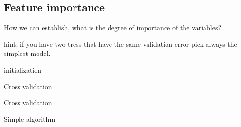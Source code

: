 \documentclass[10pt,a4paper]{article}
\begin{document}
\subsection{Feature importance}
How we can establish, what is the degree of importance of the variables?

hint: if you have two tress that have the same validation error pick always the simplest model.


\begin{algorithm}[H]
\SetAlgoLined
{}
 initialization\;
 \caption{Cross validation}
\end{algorithm}


\begin{algorithm}[H]
\SetAlgoLined
{} 
 \caption{Cross validation}
\end{algorithm}

\begin{algorithm}[H]
\SetAlgoLined
{}
\caption{Simple algorithm}
\end{algorithm}
\end{document}
